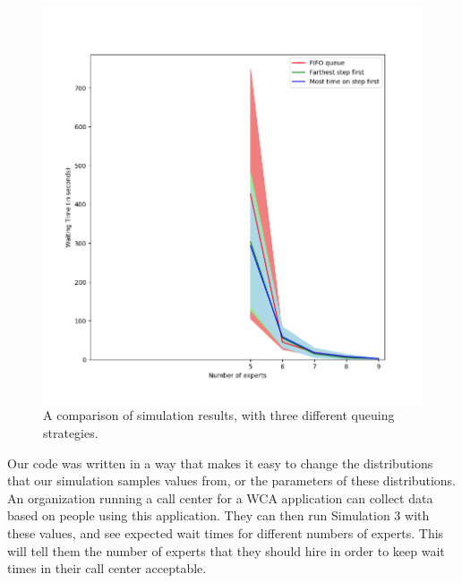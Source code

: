\begin{figure}[H]
  \includegraphics[width=\textwidth]{figures/montecarlo/full_three_strategies.png}
  \caption{
    A comparison of simulation results, with three different queuing strategies.
  }\label{fig:full_three_strategies}
\end{figure}

Our code was written in a way that makes it easy to change the distributions
that our simulation samples values from, or the parameters of these
distributions.
An organization running a call center for a WCA application can collect data
based on people using this application.
They can then run Simulation 3 with these values, and see expected wait times
for different numbers of experts.
This will tell them the number of experts that they should hire in order to keep
wait times in their call center acceptable.
